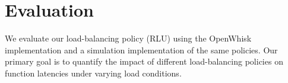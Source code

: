 \vspace*{-0.2cm}
\section{Evaluation}
\label{sec:eval}
We evaluate our load-balancing policy (RLU) using the OpenWhisk implementation and a simulation implementation of the same policies. 
Our primary goal is to quantify the impact of different load-balancing policies on function latencies under varying load conditions. 



